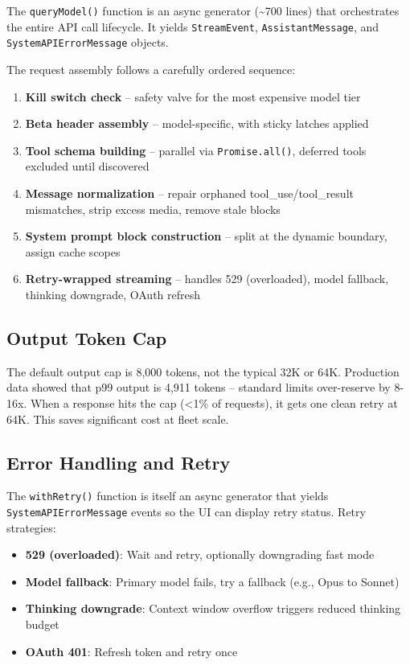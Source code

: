 \documentclass[
  english,
  11pt,
  letterpaper,
]{book}
\providecommand{\tightlist}{%
  \setlength{\itemsep}{0pt}\setlength{\parskip}{0pt}}
\begin{document}
The \texttt{queryModel()} function is an async generator
(\textasciitilde700 lines) that orchestrates the entire API call
lifecycle. It yields \texttt{StreamEvent}, \texttt{AssistantMessage},
and \texttt{SystemAPIErrorMessage} objects.

The request assembly follows a carefully ordered sequence:

\begin{enumerate}
\def\labelenumi{\arabic{enumi}.}
\tightlist
\item
  \textbf{Kill switch check} -- safety valve for the most expensive
  model tier
\item
  \textbf{Beta header assembly} -- model-specific, with sticky latches
  applied
\item
  \textbf{Tool schema building} -- parallel via \texttt{Promise.all()},
  deferred tools excluded until discovered
\item
  \textbf{Message normalization} -- repair orphaned
  tool\_use/tool\_result mismatches, strip excess media, remove stale
  blocks
\item
  \textbf{System prompt block construction} -- split at the dynamic
  boundary, assign cache scopes
\item
  \textbf{Retry-wrapped streaming} -- handles 529 (overloaded), model
  fallback, thinking downgrade, OAuth refresh
\end{enumerate}

\subsection{Output Token Cap}\label{output-token-cap}

The default output cap is 8,000 tokens, not the typical 32K or 64K.
Production data showed that p99 output is 4,911 tokens -- standard
limits over-reserve by 8-16x. When a response hits the cap (\textless1\%
of requests), it gets one clean retry at 64K. This saves significant
cost at fleet scale.

\subsection{Error Handling and Retry}\label{error-handling-and-retry}

The \texttt{withRetry()} function is itself an async generator that
yields \texttt{SystemAPIErrorMessage} events so the UI can display retry
status. Retry strategies:

\begin{itemize}
\tightlist
\item
  \textbf{529 (overloaded)}: Wait and retry, optionally downgrading fast
  mode
\item
  \textbf{Model fallback}: Primary model fails, try a fallback (e.g.,
  Opus to Sonnet)
\item
  \textbf{Thinking downgrade}: Context window overflow triggers reduced
  thinking budget
\item
  \textbf{OAuth 401}: Refresh token and retry once
\end{itemize}
\end{document}
